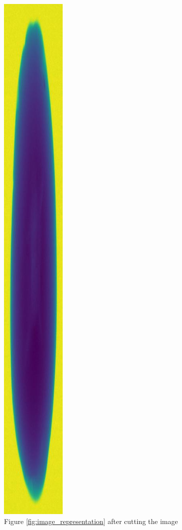 \documentclass[11pt]{article}
\begin{document}
\begin{figure}[!h]
    \centering
    \includegraphics[scale=0.18]{figurer/computer_vision/report_hollow_33_5.jpg}
    \caption{Figure \ref{fig:image_representation} after cutting the image}
    \label{fig:computer_vision_cut}
\end{figure}
\end{document}
